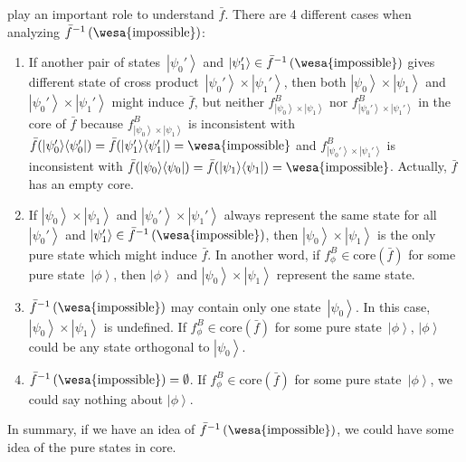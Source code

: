 \documentclass{article}
\theoremstyle{remark}
\newcommand{\imposs}{{\mbox{\wesa{impossible}}}}
\newcommand{\ket}[1]{{\left\vert{#1}\right\rangle}}
\newcommand{\op}[2]{\ensuremath{\left\vert{#1}\middle\rangle\middle\langle{#2}\right\vert}}
\newcommand{\proj}[1]{\op{#1}{#1}}
\begin{document}
play an important role to understand $\bar{f}$. There are 4 different
cases when analyzing $\bar{f}^{-1}\left(\imposs\right)$:
\begin{enumerate}
\item If another pair of states~$\ket{\psi_{0}'}$ and $\ket{\psi_{1}'}\in\bar{f}^{-1}\left(\imposs\right)$
gives different state of cross product~$\ket{\psi_{0}'}\times\ket{\psi_{1}'}$,
then both $\ket{\psi_{0}}\times\ket{\psi_{1}}$ and $\ket{\psi_{0}'}\times\ket{\psi_{1}'}$
might induce $\bar{f}$, but neither $f_{\ket{\psi_{0}}\times\ket{\psi_{1}}}^{B}$
nor $f_{\ket{\psi_{0}'}\times\ket{\psi_{1}'}}^{B}$ in the core of
$\bar{f}$ because $f_{\ket{\psi_{0}}\times\ket{\psi_{1}}}^{B}$ is
inconsistent with $\bar{f}(\proj{\psi_{0}'})=\bar{f}(\proj{\psi_{1}'})=\imposs$
and $f_{\ket{\psi_{0}'}\times\ket{\psi_{1}'}}^{B}$ is inconsistent
with $\bar{f}(\proj{\psi_{0}})=\bar{f}(\proj{\psi_{1}})=\imposs$.
Actually, $\bar{f}$ has an empty core. 
\item If $\ket{\psi_{0}}\times\ket{\psi_{1}}$ and $\ket{\psi_{0}'}\times\ket{\psi_{1}'}$
always represent the same state for all $\ket{\psi_{0}'}$ and $\ket{\psi_{1}'}\in\bar{f}^{-1}\left(\imposs\right)$,
then $\ket{\psi_{0}}\times\ket{\psi_{1}}$ is the only pure state
which might induce $\bar{f}$. In another word, if $f_{\phi}^{B}\in\mathrm{core}\left(\bar{f}\right)$
for some pure state~$\ket{\phi}$, then $\ket{\phi}$ and $\ket{\psi_{0}}\times\ket{\psi_{1}}$
represent the same state. 
\item $\bar{f}^{-1}\left(\imposs\right)$ may contain only one state~$\ket{\psi_{0}}$.
In this case, $\ket{\psi_{0}}\times\ket{\psi_{1}}$ is undefined.
If $f_{\phi}^{B}\in\mathrm{core}\left(\bar{f}\right)$ for some pure
state~$\ket{\phi}$, $\ket{\phi}$ could be any state orthogonal
to $\ket{\psi_{0}}$.
\item $\bar{f}^{-1}\left(\imposs\right)=\emptyset$. If $f_{\phi}^{B}\in\mathrm{core}\left(\bar{f}\right)$
for some pure state~$\ket{\phi}$, we could say nothing about $\ket{\phi}$.
\end{enumerate}
In summary, if we have an idea of $\bar{f}^{-1}\left(\imposs\right)$,
we could have some idea of the pure states in core.
\end{document}
